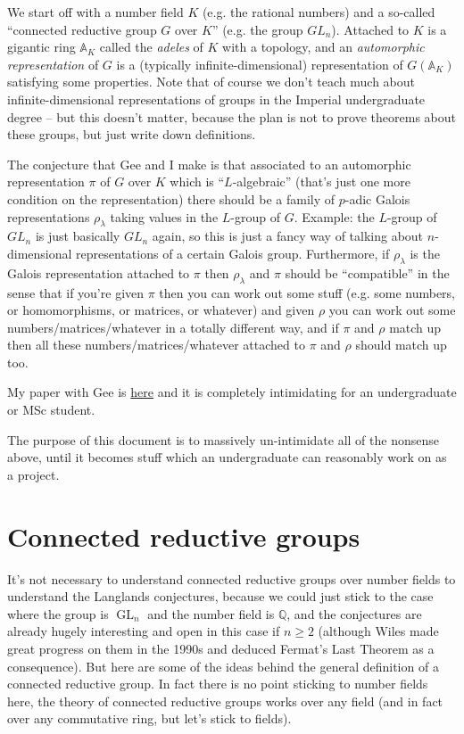 \documentclass{amsart}
\newcommand{\Q}{\mathbb{Q}}
\DeclareMathOperator{\GL}{GL}
\begin{document}
We start off with a number field $K$ (e.g. the rational numbers) and a so-called ``connected reductive group $G$ over $K$'' (e.g. the group $GL_n$). Attached to $K$ is a gigantic ring $\mathbb{A}_K$ called the \emph{adeles} of $K$ with a topology, and an \emph{automorphic representation} of $G$ is a (typically infinite-dimensional) representation of $G(\mathbb{A}_K)$ satisfying some properties. Note that of course we don't teach much about infinite-dimensional representations of groups in the Imperial undergraduate degree -- but this doesn't matter, because the plan is not to prove theorems about these groups, but just write down definitions.

The conjecture that Gee and I make is that associated to an automorphic representation $\pi$ of $G$ over $K$ which is ``$L$-algebraic'' (that's just one more condition on the representation) there should be a family of $p$-adic Galois representations $\rho_\lambda$ taking values in the $L$-group of $G$. Example: the $L$-group of $GL_n$ is just basically $GL_n$ again, so this is just a fancy way of talking about $n$-dimensional representations of a certain Galois group. Furthermore, if $\rho_\lambda$ is the Galois representation attached to $\pi$ then $\rho_\lambda$ and $\pi$ should be ``compatible'' in the sense that if you're given $\pi$ then you can work out some stuff (e.g. some numbers, or homomorphisms, or matrices, or whatever) and given $\rho$ you can work out some numbers/matrices/whatever in a totally different way, and if $\pi$ and $\rho$ match up then all these numbers/matrices/whatever attached to $\pi$ and $\rho$ should match up too.

My paper with Gee is \href{https://arxiv.org/abs/1009.0785}{here} and it is completely intimidating for an undergraduate or MSc student.

The purpose of this document is to massively un-intimidate all of the nonsense above, until it becomes stuff which an undergraduate can reasonably work on as a project. 

\section{Connected reductive groups}

It's not necessary to understand connected reductive groups over number fields to understand the Langlands conjectures, because we could just stick to the case where the group is $\GL_n$ and the number field is $\Q$, and the conjectures are already hugely interesting and open in this case if $n\geq2$ (although Wiles made great progress on them in the 1990s and deduced Fermat's Last Theorem as a consequence). But here are some of the ideas behind the general definition of a connected reductive group. In fact there is no point sticking to number fields here, the theory of connected reductive groups works over any field (and in fact over any commutative ring, but let's stick to fields).
\end{document}
